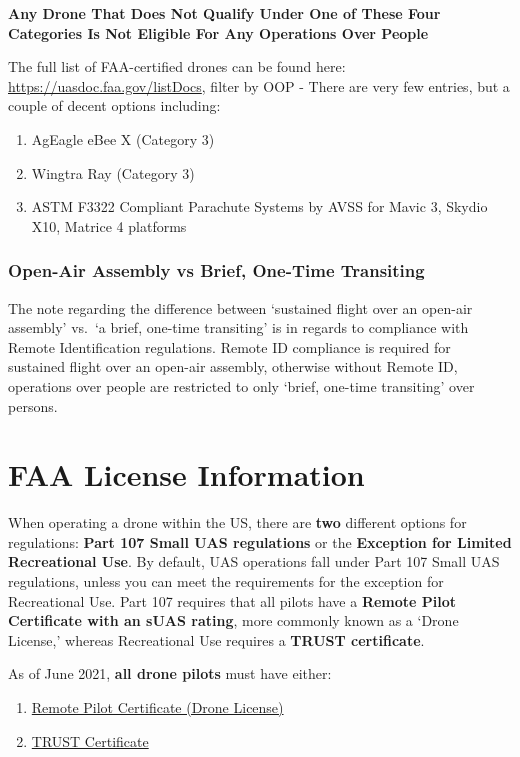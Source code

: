 \documentclass[
  12pt,
]{book}
\providecommand{\tightlist}{%
  \setlength{\itemsep}{0pt}\setlength{\parskip}{0pt}}
\begin{document}
\textbf{Any Drone That Does Not Qualify Under One of These Four Categories Is Not Eligible For Any Operations Over People}

The full list of FAA-certified drones can be found here: \url{https://uasdoc.faa.gov/listDocs}, filter by OOP - There are very few entries, but a couple of decent options including:

\begin{enumerate}
\def\labelenumi{\arabic{enumi}.}
\tightlist
\item
  AgEagle eBee X (Category 3)
\item
  Wingtra Ray (Category 3)
\item
  ASTM F3322 Compliant Parachute Systems by AVSS for Mavic 3, Skydio X10, Matrice 4 platforms
\end{enumerate}

\subsection{Open-Air Assembly vs Brief, One-Time Transiting}\label{open-air-assembly-vs-brief-one-time-transiting}

The note regarding the difference between `sustained flight over an open-air assembly' vs.~`a brief, one-time transiting' is in regards to compliance with Remote Identification regulations. Remote ID compliance is required for sustained flight over an open-air assembly, otherwise without Remote ID, operations over people are restricted to only `brief, one-time transiting' over persons.

\chapter{FAA License Information}\label{license}

When operating a drone within the US, there are \textbf{two} different options for regulations: \textbf{Part 107 Small UAS regulations} or the \textbf{Exception for Limited Recreational Use}. By default, UAS operations fall under Part 107 Small UAS regulations, unless you can meet the requirements for the exception for Recreational Use. Part 107 requires that all pilots have a \textbf{Remote Pilot Certificate with an sUAS rating}, more commonly known as a `Drone License,' whereas Recreational Use requires a \textbf{TRUST certificate}.

As of June 2021, \textbf{all drone pilots} must have either:

\begin{enumerate}
\def\labelenumi{\arabic{enumi}.}
\tightlist
\item
  \hyperref[get-license]{Remote Pilot Certificate (Drone License)}
\item
  \hyperref[TRUST]{TRUST Certificate}
\end{enumerate}
\end{document}
